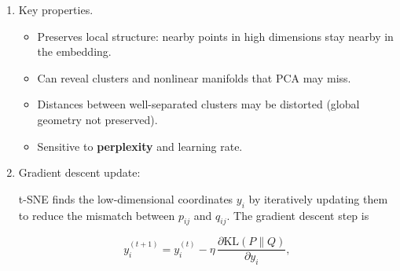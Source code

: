 \documentclass{article}
\begin{document}
\begin{enumerate}
\begin{enumerate}
\begin{itemize}
\item Comes from information theory to measure the expected information lost when approximating one probability distribution with another.
\item $P(i)$ is the probability of outcome $i$ under the “true” distribution.
\item $Q(i)$ is the probability of outcome $i$ under the approximating distribution.
\item $\log \frac{P(i)}{Q(i)}$ measures how much “surprise” or information is gained by assuming $Q$ instead of $P$ for that outcome.  Sign of log term signals $Q$ over or under estimating.
\item Multiplying by $P(i)$ gives the expected contribution from outcome $i$.
\item KL divergence is always non-negative: $\text{KL}(P\|Q) \ge 0$.
\item $\text{KL}(P\|Q) = 0$ only if $P = Q$ exactly.
\item Intuition: it quantifies the “extra surprise” when using $Q$ to approximate $P$.
\item In t-SNE: $P$ represents high-dimensional similarities, $Q$ represents low-dimensional similarities. Minimizing KL ensures the low-dimensional map preserves neighborhood structure.
\end{itemize}
\end{enumerate}

\item Key properties.  

\begin{itemize}
\item Preserves local structure: nearby points in high dimensions stay nearby in the embedding.  
\item Can reveal clusters and nonlinear manifolds that PCA may miss.  
\item Distances between well-separated clusters may be distorted (global geometry not preserved).  
\item Sensitive to \textbf{perplexity} and learning rate.
\end{itemize}

\item Gradient descent update:

t-SNE finds the low-dimensional coordinates $y_i$ by iteratively updating them to reduce the mismatch between $p_{ij}$ and $q_{ij}$. The gradient descent step is

\[
y_i^{(t+1)} = y_i^{(t)} - \eta \, \frac{\partial \text{KL}(P\|Q)}{\partial y_i},
\]


\end{enumerate}
\end{document}
